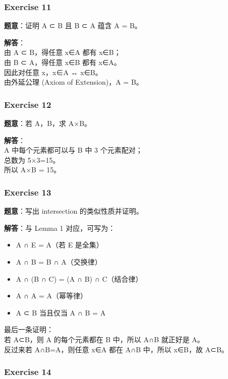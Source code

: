 \documentclass[
  11pt,
]{article}
\providecommand{\tightlist}{%
  \setlength{\itemsep}{0pt}\setlength{\parskip}{0pt}}
\begin{document}
\subsubsection{Exercise 11}\label{exercise-11}

\textbf{题意}：证明 A ⊂ B 且 B ⊂ A 蕴含 A = B。

\textbf{解答}：\\
由 A ⊂ B，得任意 x∈A 都有 x∈B；\\
由 B ⊂ A，得任意 x∈B 都有 x∈A。\\
因此对任意 x，x∈A ↔ x∈B。\\
由外延公理 (Axiom of Extension)，A = B。

\subsubsection{Exercise 12}\label{exercise-12}

\textbf{题意}：若 \textbar A，\textbar B，求
\textbar A×B\textbar。

\textbf{解答}：\\
A 中每个元素都可以与 B 中 3 个元素配对；\\
总数为 5×3=15。\\
所以 \textbar A×B\textbar{} = 15。

\subsubsection{Exercise 13}\label{exercise-13}

\textbf{题意}：写出 intersection 的类似性质并证明。

\textbf{解答}：与 Lemma 1 对应，可写为：

\begin{itemize}
\tightlist
\item
  A ∩ E = A（若 E 是全集）
\item
  A ∩ B = B ∩ A（交换律）
\item
  A ∩ (B ∩ C) = (A ∩ B) ∩ C（结合律）
\item
  A ∩ A = A（幂等律）
\item
  A ⊂ B 当且仅当 A ∩ B = A
\end{itemize}

最后一条证明：\\
若 A⊂B，则 A 的每个元素都在 B 中，所以 A∩B 就正好是 A。\\
反过来若 A∩B=A，则任意 x∈A 都在 A∩B 中，所以 x∈B，故 A⊂B。

\subsubsection{Exercise 14}\label{exercise-14}
\end{document}
